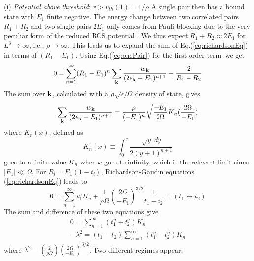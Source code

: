 \documentclass[5p,twocolumn]{elsarticle}
\begin{document}
(i) {\it Potential above threshold}: $v>v_{th}(1)=1/\rho$ A single pair then has a bound state with $E_1$  finite negative. The energy change between two correlated pairs $R_{1}+R_{2}$ and two single pairs  $2E_{1}$ only comes from Pauli blocking due to the very peculiar form of the reduced BCS potential \cite{moth}. We thus expect $R_1+R_2\approx2E_1$ for $L^3\rightarrow\infty$, i.e., $\rho\rightarrow\infty$. This leads us to expand the sum of Eq.(\ref{eq:richardsonEq}) in terms of $(R_{1}-E_{1})$.  Using Eq.(\ref{eq:onePair}) for the first order term, we get
\begin{equation}
0=\sum_{n=1}^{\infty}(R_{1}-E_{1})^{n}\sum_{\mathbf{k}}\frac{w_{\mathbf{k}}}{(2\epsilon_{\mathbf{k}}-E_1)^{n+1}}+\frac{2}{R_1-R_2}
\end{equation}
The sum over $\mathbf{k}$, calculated with a $\rho\sqrt{\epsilon/\Omega}$ density of state, gives
\begin{equation}
\sum_{\mathbf{k}}\frac{w_{\mathbf{k}}}{(2\epsilon_{\mathbf{k}}-E_1)^{n+1}}=\\\frac{\rho}{(-E_{1})^{n}}\sqrt{\frac{-E_{1}}{2\Omega}}K_{n}(\frac{2\Omega}{-E_{1}})
\end{equation}
where $K_{n}(x)$, defined as
\begin{equation}
K_{n}(x)\equiv\int_{0}^{x}\frac{\sqrt{y}\;dy}{2(y+1)^{n+1}}
\end{equation}
goes to a finite value $K_{n}$ when $x$ goes to infinity, which is the relevant limit since $|E_1|\ll\Omega$.
For
$R_{i}=E_{1}(1-t_{i})$, Richardson-Gaudin equations (\ref{eq:richardsonEq}) leads to
\begin{equation}
0=\sum_{n=1}^{\infty}t_{1}^{n}K_{n}+\frac{1}{\rho\Omega}\left(\frac{2\Omega}{-E_{1}}\right)^{3/2}\frac{1}{t_1-t_2}=(t_{1}\leftrightarrow{}t_{2})
\end{equation}
The sum and difference of these two equations give
\begin{gather}
0=\sum_{n=1}^{\infty}(t_{1}^{n}+t_{2}^{n})K_{n}\label{eq:t2}\\
-\lambda^{2}=(t_{1}-t_{2})\sum_{n=1}^{\infty}(t_{1}^{n}-t_{2}^{n})K_{n}\label{eq:t1}
\end{gather}
where $\lambda^2=(\frac{2}{\rho\Omega})(\frac{2\Omega}{-E_{1}})^{3/2}$.
Two different regimes appear; 
\end{document}
